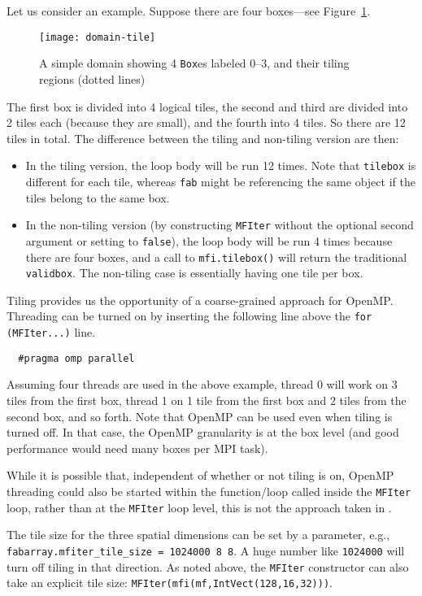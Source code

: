 Let us consider an example.  Suppose there are four boxes---see
Figure~\ref{fig:domain-tiling}.
\begin{figure}[t]
\centering
\texttt{[image: domain-tile]}
\caption{\label{fig:domain-tiling} A simple domain showing 4
  {\tt Box}es labeled 0--3, and their tiling regions (dotted lines)}
\end{figure}
%
The first box is divided into 4 logical tiles, the second and third
are divided into 2 tiles each (because they are small), and the fourth
into 4 tiles.  So there are 12 tiles in total.  The difference between
the tiling and non-tiling version are then:
\begin{itemize}
\item In the tiling version,
the loop body will be run 12 times.  Note that {\tt tilebox} is
different for each tile, whereas {\tt fab} might be referencing the
same object if the tiles belong to the same box.

\item In the non-tiling
version (by constructing {\tt MFIter} without the optional second
argument or setting to {\tt false}), the loop body will be run 4 times
because there are four boxes, and a call to {\tt mfi.tilebox()} will
return the traditional {\tt validbox}.  The non-tiling case is
essentially having one tile per box.
\end{itemize}
 
Tiling provides us the opportunity of a coarse-grained approach for
OpenMP.  Threading can be turned on by inserting the following line
above the {\tt for (MFIter...)} line.
\begin{lstlisting}
  #pragma omp parallel
\end{lstlisting}
Assuming four threads are used in the above example, thread 0 will
work on 3 tiles from the first box, thread 1 on 1 tile from the first
box and 2 tiles from the second box, and so forth.  Note that 
OpenMP can be used even when tiling is turned off.  In that case, the
OpenMP granularity is at the box level (and good performance would need
many boxes per MPI task).

While it is possible that, independent of whether or not tiling is on, OpenMP
threading could also be started within the function/loop called inside the
{\tt MFIter} loop, rather than at the {\tt MFIter} loop level, this
is not the approach taken in \iamr.

The tile size for the three spatial dimensions can be set by a
parameter, e.g., {\tt fabarray.mfiter\_tile\_size = 1024000 8 8}.  A
huge number like {\tt 1024000} will turn off tiling in that direction.
As noted above, the {\tt MFIter} constructor can also take an explicit
tile size: {\tt MFIter(mfi(mf,IntVect(128,16,32)))}.


